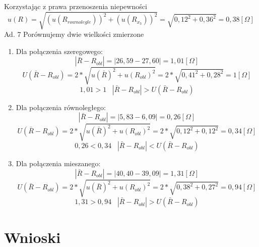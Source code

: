 \documentclass[a4paper,10pt,twoside]{article}
\begin{document}
	 Korzystając z prawa przenoszenia niepewności $$u(R) =\sqrt{(u(R_{rownolegle}))^2 + (u(R_{x_3}))^2} = \sqrt{0,12^2 + 0,36^2} = 0,38[\Omega]$$
	Ad. 7 Porównujemy dwie wielkości zmierzone
	\begin{enumerate}
		\item Dla połączenia szeregowego:
		$$|\bar{R} - R_{obl}| = |26,59 - 27,60| = 1,01[\Omega]$$
		$$U(\bar{R} - R_{obl}) = 2*\sqrt{u(\bar{R})^2 + u(R_{obl})^2} = 2*\sqrt{0,41^2 + 0,28^2} = 1[\Omega]$$ 
		$$1,01 > 1 \hspace{10pt} |\bar{R} - R_{obl}| > U(\bar{R} - R_{obl})$$
		\item Dla połączenia równoległego:
		$$|\bar{R} - R_{obl}| = |5,83 - 6,09| = 0,26[\Omega]$$
		$$U(\bar{R} - R_{obl}) = 2*\sqrt{u(\bar{R})^2 + u(R_{obl})^2} = 2*\sqrt{0,12^2 + 0,12^2} = 0,34[\Omega]$$ 
		$$0,26 < 0,34 \hspace{10pt} |\bar{R} - R_{obl}| < U(\bar{R} - R_{obl})$$
		\item Dla połączenia mieszanego:
		$$|\bar{R} - R_{obl}| = |40,40 - 39,09| = 1,31[\Omega]$$
		$$U(\bar{R} - R_{obl}) = 2*\sqrt{u(\bar{R})^2 + u(R_{obl})^2} = 2*\sqrt{0,38^2 + 0,27^2} = 0,94[\Omega]$$ 
		$$1,31 > 0,94 \hspace{10pt} |\bar{R} - R_{obl}| > U(\bar{R} - R_{obl})$$
	\end{enumerate}
	\section{Wnioski}

  
\end{document}

